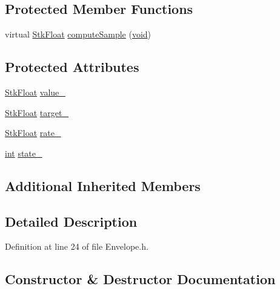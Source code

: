 \subsection*{Protected Member Functions}
\begin{DoxyCompactItemize}
\item 
virtual \hyperlink{namespace_nyq_a044fa20a706520a617bbbf458a7db7e4}{Stk\+Float} \hyperlink{class_nyq_1_1_envelope_af641725192ae9b53325713e9a206648e}{compute\+Sample} (\hyperlink{sound_8c_ae35f5844602719cf66324f4de2a658b3}{void})
\end{DoxyCompactItemize}
\subsection*{Protected Attributes}
\begin{DoxyCompactItemize}
\item 
\hyperlink{namespace_nyq_a044fa20a706520a617bbbf458a7db7e4}{Stk\+Float} \hyperlink{class_nyq_1_1_envelope_ace85116d10e34e4b60219ade97c078f1}{value\+\_\+}
\item 
\hyperlink{namespace_nyq_a044fa20a706520a617bbbf458a7db7e4}{Stk\+Float} \hyperlink{class_nyq_1_1_envelope_ac7c1316fcd3048369131f4e801341d52}{target\+\_\+}
\item 
\hyperlink{namespace_nyq_a044fa20a706520a617bbbf458a7db7e4}{Stk\+Float} \hyperlink{class_nyq_1_1_envelope_ab33da3db41af1c55705a471720843727}{rate\+\_\+}
\item 
\hyperlink{xmltok_8h_a5a0d4a5641ce434f1d23533f2b2e6653}{int} \hyperlink{class_nyq_1_1_envelope_a9a0154ef9655e04dd459d6ee6d60504f}{state\+\_\+}
\end{DoxyCompactItemize}
\subsection*{Additional Inherited Members}


\subsection{Detailed Description}


Definition at line 24 of file Envelope.\+h.



\subsection{Constructor \& Destructor Documentation}
